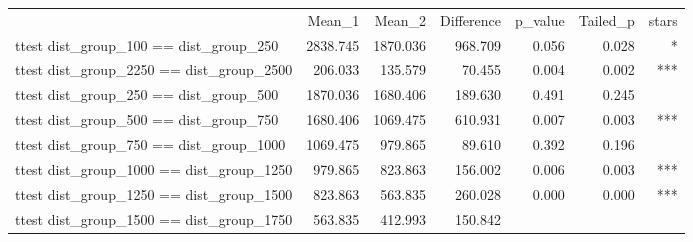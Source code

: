 \documentclass{article}
\begin{document}
\begin{table}[!h]
\centering
\begin{tabular}{lllllll}
\cline{1-7}
\multicolumn{1}{c}{} &
  \multicolumn{1}{|r}{Mean\_1} &
  \multicolumn{1}{r}{Mean\_2} &
  \multicolumn{1}{r}{Difference} &
  \multicolumn{1}{r}{p\_value} &
  \multicolumn{1}{r}{Tailed\_p} &
  \multicolumn{1}{r}{stars} \\
\cline{1-7}
\multicolumn{1}{l}{ttest dist\_group\_100 == dist\_group\_250} &
  \multicolumn{1}{|r}{2838.745} &
  \multicolumn{1}{r}{1870.036} &
  \multicolumn{1}{r}{968.709} &
  \multicolumn{1}{r}{0.056} &
  \multicolumn{1}{r}{0.028} &
  \multicolumn{1}{r}{*} \\
\multicolumn{1}{l}{ttest dist\_group\_2250 == dist\_group\_2500} &
  \multicolumn{1}{|r}{206.033} &
  \multicolumn{1}{r}{135.579} &
  \multicolumn{1}{r}{70.455} &
  \multicolumn{1}{r}{0.004} &
  \multicolumn{1}{r}{0.002} &
  \multicolumn{1}{r}{***} \\
\multicolumn{1}{l}{ttest dist\_group\_250 == dist\_group\_500} &
  \multicolumn{1}{|r}{1870.036} &
  \multicolumn{1}{r}{1680.406} &
  \multicolumn{1}{r}{189.630} &
  \multicolumn{1}{r}{0.491} &
  \multicolumn{1}{r}{0.245} &
  \multicolumn{1}{r}{} \\
\multicolumn{1}{l}{ttest dist\_group\_500 == dist\_group\_750} &
  \multicolumn{1}{|r}{1680.406} &
  \multicolumn{1}{r}{1069.475} &
  \multicolumn{1}{r}{610.931} &
  \multicolumn{1}{r}{0.007} &
  \multicolumn{1}{r}{0.003} &
  \multicolumn{1}{r}{***} \\
\multicolumn{1}{l}{ttest dist\_group\_750 == dist\_group\_1000} &
  \multicolumn{1}{|r}{1069.475} &
  \multicolumn{1}{r}{979.865} &
  \multicolumn{1}{r}{89.610} &
  \multicolumn{1}{r}{0.392} &
  \multicolumn{1}{r}{0.196} &
  \multicolumn{1}{r}{} \\
\multicolumn{1}{l}{ttest dist\_group\_1000 == dist\_group\_1250} &
  \multicolumn{1}{|r}{979.865} &
  \multicolumn{1}{r}{823.863} &
  \multicolumn{1}{r}{156.002} &
  \multicolumn{1}{r}{0.006} &
  \multicolumn{1}{r}{0.003} &
  \multicolumn{1}{r}{***} \\
\multicolumn{1}{l}{ttest dist\_group\_1250 == dist\_group\_1500} &
  \multicolumn{1}{|r}{823.863} &
  \multicolumn{1}{r}{563.835} &
  \multicolumn{1}{r}{260.028} &
  \multicolumn{1}{r}{0.000} &
  \multicolumn{1}{r}{0.000} &
  \multicolumn{1}{r}{***} \\
\multicolumn{1}{l}{ttest dist\_group\_1500 == dist\_group\_1750} &
  \multicolumn{1}{|r}{563.835} &
  \multicolumn{1}{r}{412.993} &
  \multicolumn{1}{r}{150.842} &

\end{tabular}
\end{table}
\end{document}
